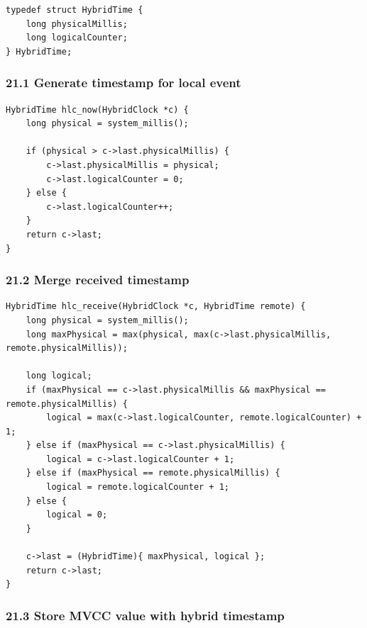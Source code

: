 \documentclass[10pt,letterpaper]{article}
\begin{document}
\begin{verbatim}
typedef struct HybridTime {
    long physicalMillis;
    long logicalCounter;
} HybridTime;
\end{verbatim}

\subsubsection*{21.1 Generate timestamp for local event}

\begin{verbatim}
HybridTime hlc_now(HybridClock *c) {
    long physical = system_millis();

    if (physical > c->last.physicalMillis) {
        c->last.physicalMillis = physical;
        c->last.logicalCounter = 0;
    } else {
        c->last.logicalCounter++;
    }
    return c->last;
}
\end{verbatim}

\subsubsection*{21.2 Merge received timestamp}

\begin{verbatim}
HybridTime hlc_receive(HybridClock *c, HybridTime remote) {
    long physical = system_millis();
    long maxPhysical = max(physical, max(c->last.physicalMillis, remote.physicalMillis));

    long logical;
    if (maxPhysical == c->last.physicalMillis && maxPhysical == remote.physicalMillis) {
        logical = max(c->last.logicalCounter, remote.logicalCounter) + 1;
    } else if (maxPhysical == c->last.physicalMillis) {
        logical = c->last.logicalCounter + 1;
    } else if (maxPhysical == remote.physicalMillis) {
        logical = remote.logicalCounter + 1;
    } else {
        logical = 0;
    }

    c->last = (HybridTime){ maxPhysical, logical };
    return c->last;
}
\end{verbatim}

\subsubsection*{21.3 Store MVCC value with hybrid timestamp}
\end{document}

